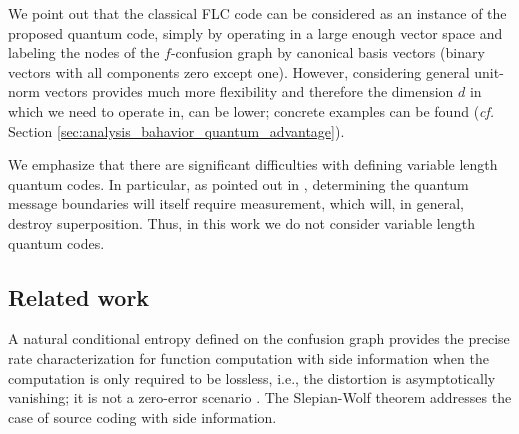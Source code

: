 \documentclass[journal, onecolumn, draftcls]{IEEEtran}
\theoremstyle{definition}
\newcommand{\meng}[1]{\marginpar{+}{\bf Ruoyu's remark}: {\em #1}}
\newcommand{\aditya}[1]{\marginpar{+}{\bf Aditya's remark}: {\em #1}}
\begin{document}
We point out that the classical FLC code can be considered as an instance of the proposed quantum code, simply by operating in a large enough vector space and labeling the nodes of the $f$-confusion graph by canonical basis vectors (binary vectors with all components zero except one). However, considering general unit-norm vectors provides much more flexibility and therefore the dimension $d$ in which we need to operate in, can be lower; concrete examples can be found ({\it cf.} Section \ref{sec:analysis_bahavior_quantum_advantage}).

We emphasize that there are significant difficulties with defining variable length quantum codes. In particular, as pointed out in \cite{BraunsteinFGH98}, determining the quantum message boundaries will itself require measurement, which will, in general, destroy superposition. Thus, in this work we do not consider variable length quantum codes. %
 


\subsection{Related work}\label{subsec:related_work}
A natural conditional entropy defined on the confusion graph provides the precise rate characterization for function computation with side information when the computation is only required to be lossless, i.e., the distortion is asymptotically vanishing; it is not a zero-error scenario \cite{OrlitskyR_01}. The Slepian-Wolf theorem \cite{slepian1973noiseless} addresses the case of source coding with side information.
\end{document}

